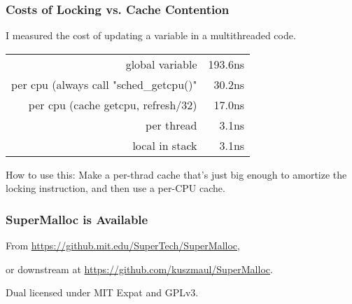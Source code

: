 \documentclass[xcolor=dvipsnames,14pt]{beamer}
\begin{document}
\begin{frame}[fragile]
\frametitle{Costs of Locking vs. Cache Contention}

I measured the cost of updating a variable in a multithreaded code.

\begin{tabular}{rr}
                                                  global variable &    193.6ns \\
            per cpu (always call "sched_getcpu()"  &     30.2ns \\
per cpu (cache getcpu, refresh/32) &     17.0ns \\
                                                      per thread &      3.1ns \\
                                                  local in stack &      3.1ns \\
\end{tabular}

How to use this:  Make a per-thrad cache that's just big enough to amortize the locking instruction, and then use a per-CPU cache.
\end{frame}

\begin{frame}
\frametitle{SuperMalloc is Available}

From {\small \url{https://github.mit.edu/SuperTech/SuperMalloc}},

or downstream at {\small \url{https://github.com/kuszmaul/SuperMalloc}}.

Dual licensed under MIT Expat and GPLv3.
\end{frame}
\end{document}
